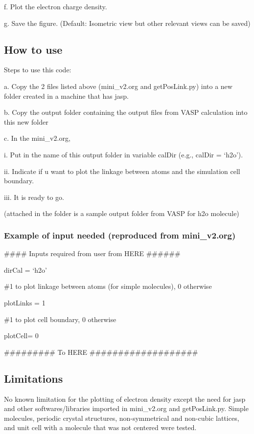 \documentclass[11pt]{article}
\begin{document}
f. Plot the electron charge density.


g. Save the figure. (Default: Isometric view but other relevant views can be saved)
\subsection{How to use}
\label{sec-1-4}

Steps to use this code:


a. Copy the 2 files listed above (mini\_v2.org and getPosLink.py) into a new folder created in a machine that has jasp.


b. Copy the output folder containing the output files from VASP calculation into this new folder


c. In the mini\_v2.org,


      i.   Put in the name of this output folder in variable calDir (e.g., calDir = `h2o').

      ii.  Indicate if u want to plot the linkage between atoms and the simulation cell boundary.

      iii. It is ready to go.

(attached in the folder is a sample output folder from VASP for h2o molecule)
\subsubsection{Example of input needed (reproduced from mini\_v2.org)}
\label{sec-1-4-1}


\#\#\#\# Inputs required from user from HERE \#\#\#\#\#\#

dirCal = `h2o'

\#1 to plot linkage between atoms (for simple molecules), 0 otherwise

plotLinks = 1


\#1 to plot cell boundary, 0 otherwise

plotCell= 0

\#\#\#\#\#\#\#\#\#    To HERE   \#\#\#\#\#\#\#\#\#\#\#\#\#\#\#\#\#\#\#
\subsection{Limitations}
\label{sec-1-5}

No known limitation for the plotting of electron density except the need for jasp and other softwares/libraries imported in mini\_v2.org and getPosLink.py.  Simple molecules, periodic crystal structures, non-symmetrical and non-cubic lattices, and unit cell with a molecule that was not centered were tested.
\end{document}
